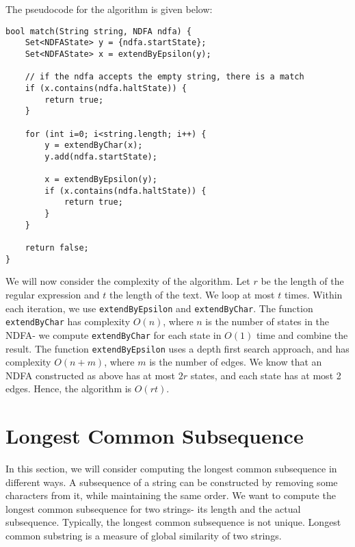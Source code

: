 \documentclass[a4paper, openany]{memoir}
\begin{document}
    The pseudocode for the algorithm is given below:
\begin{lstlisting}[language=pseudocode]
bool match(String string, NDFA ndfa) {
    Set<NDFAState> y = {ndfa.startState};
    Set<NDFAState> x = extendByEpsilon(y);
    
    // if the ndfa accepts the empty string, there is a match
    if (x.contains(ndfa.haltState)) {
        return true;
    }

    for (int i=0; i<string.length; i++) {
        y = extendByChar(x);
        y.add(ndfa.startState);

        x = extendByEpsilon(y);
        if (x.contains(ndfa.haltState)) {
            return true;
        }
    }

    return false;
}
\end{lstlisting}

    We will now consider the complexity of the algorithm. Let $r$ be the length of the regular expression and $t$ the length of the text. We loop at most $t$ times. Within each iteration, we use \texttt{extendByEpsilon} and \texttt{extendByChar}. The function \texttt{extendByChar} has complexity $O(n)$, where $n$ is the number of states in the NDFA- we compute \texttt{extendByChar} for each state in $O(1)$ time and combine the result. The function \texttt{extendByEpsilon} uses a depth first search approach, and has complexity $O(n+m)$, where $m$ is the number of edges. We know that an NDFA constructed as above has at most $2r$ states, and each state has at most 2 edges. Hence, the algorithm is $O(rt)$.
    \newpage

    \section{Longest Common Subsequence}
    In this section, we will consider computing the longest common subsequence in different ways. A subsequence of a string can be constructed by removing some characters from it, while maintaining the same order. We want to compute the longest common subsequence for two strings- its length and the actual subsequence. Typically, the longest common subsequence is not unique. Longest common substring is a measure of global similarity of two strings. 
\end{document}

